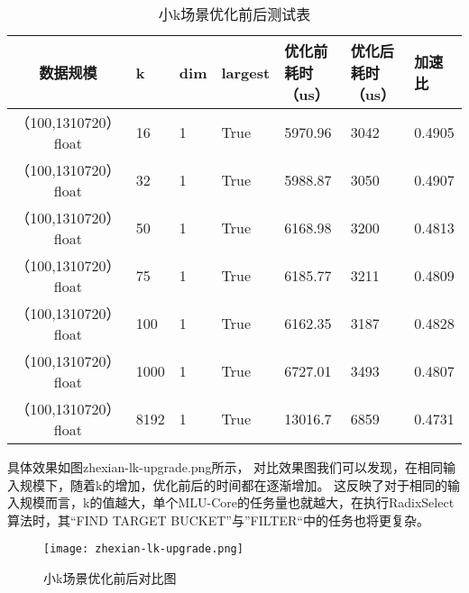 \begin{table}
    \centering
    \caption{小k场景优化前后测试表}
    \label{tab:bench_littlek_upgrade}
    \begin{tabular}{cllllll}
        \toprule
        数据规模       &k  & dim  & largest & 优化前耗时（us）    & 优化后耗时（us） &加速比\\
        \midrule
        （100,1310720） float&16&  1     & True      & 5970.96 & 3042 &  0.4905\\
        （100,1310720） float&32&  1     & True      & 5988.87 & 3050 &  0.4907\\
        （100,1310720） float&50&  1     & True      & 6168.98 & 3200 &  0.4813 \\
        （100,1310720） float&75&  1     & True      & 6185.77 & 3211 &  0.4809 \\
        （100,1310720） float&100&  1     & True      & 6162.35& 3187 &  0.4828 \\
        （100,1310720） float&1000&  1     & True      & 6727.01 & 3493 & 0.4807 \\
        （100,1310720） float&8192&  1     & True      & 13016.7 & 6859 & 0.4731 \\
        
        \bottomrule
    \end{tabular}
    \end{table}
具体效果如图{zhexian-lk-upgrade.png}所示，
对比效果图我们可以发现，在相同输入规模下，随着k的增加，优化前后的时间都在逐渐增加。
这反映了对于相同的输入规模而言，k的值越大，单个MLU-Core的任务量也就越大，在执行RadixSelect
算法时，其“FIND TARGET BUCKET”与”FILTER“中的任务也将更复杂。

\begin{figure}[ht]
        \centering
        \texttt{[image: zhexian-lk-upgrade.png]}
        \caption{小k场景优化前后对比图}
        \label{fig:bench_littlek_upgrade_zhexian}
    \end{figure}
    

